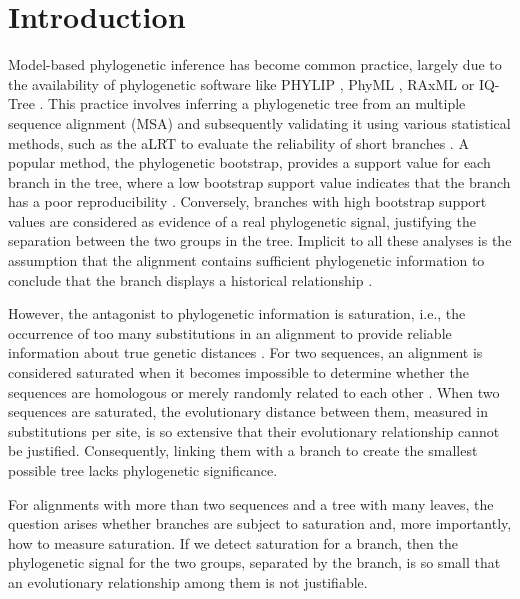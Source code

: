 \section*{Introduction}
Model-based phylogenetic inference has become common practice, largely due to the availability of phylogenetic software like PHYLIP , PhyML , RAxML  or IQ-Tree . This practice involves inferring a phylogenetic tree from an multiple sequence alignment (MSA) and subsequently validating it using various statistical methods, such as the aLRT to evaluate the reliability of short branches . A popular method, the phylogenetic bootstrap, provides a support value for each branch in the tree, where a low bootstrap support value indicates that the branch has a poor reproducibility . Conversely, branches with high bootstrap support values are considered as evidence of a real phylogenetic signal, justifying the separation between the two groups in the tree. Implicit to all these analyses is the assumption that the alignment contains sufficient phylogenetic information to conclude that the branch displays a historical relationship .

\medskip
However, the antagonist to phylogenetic information is saturation, i.e., the occurrence of too many substitutions in an alignment to provide reliable information about true genetic distances . For two sequences, an alignment is considered saturated when it becomes impossible to determine whether the sequences are homologous or merely randomly related to each other . When two sequences are saturated, the evolutionary distance between them, measured in substitutions per site, is so extensive that their evolutionary relationship cannot be justified. Consequently, linking them with a branch to create the smallest possible tree lacks phylogenetic significance.

\medskip

For alignments with more than two sequences and a tree with many leaves, the question arises whether branches are subject to saturation and, more importantly, how to measure saturation.
If we detect saturation for a branch, then the phylogenetic signal for the two groups, separated by the branch, is so small that an evolutionary relationship among them is not justifiable.

\medskip 

